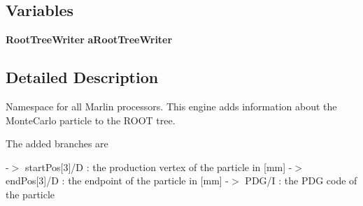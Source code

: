 \subsection*{Variables}
\begin{DoxyCompactItemize}
\item 
{\bf RootTreeWriter} {\bfseries aRootTreeWriter}\label{namespacemarlin_a9b6fb833e71456793d8aef01d758b027}

\end{DoxyCompactItemize}


\subsection{Detailed Description}
Namespace for all Marlin processors. This engine adds information about the MonteCarlo particle to the ROOT tree.

The added branches are

-\/$>$ startPos[3]/D : the production vertex of the particle in [mm] -\/$>$ endPos[3]/D : the endpoint of the particle in [mm] -\/$>$ PDG/I : the PDG code of the particle 